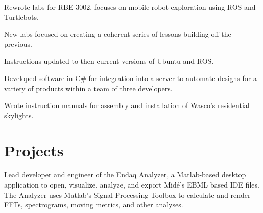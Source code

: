 \documentclass[letterpaper]{deedy-resume} %
\begin{document}
\begin{minipage}[t]{0.66\textwidth}
\sectionspace %



\begin{tightitemize}
\item Rewrote labs for RBE 3002, focuses on mobile robot exploration using ROS and Turtlebots.
\item New labs focused on creating a coherent series of lessons building off the previous.
\item Instructions updated to then-current versions of Ubuntu and ROS.
\end{tightitemize}

\sectionspace %



\begin{tightitemize}
\item Developed software in C\# for integration into a server to automate designs for a variety of products within a team of three developers.
\item Wrote instruction manuals for assembly and installation of Wasco's residential skylights.
\end{tightitemize}

\sectionspace %

\end{minipage} 




\newpage %

\section{Projects}


Lead developer and engineer of the Endaq Analyzer, a Matlab-based desktop application to open, visualize, analyze, and export Midé's EBML based IDE files.  The Analyzer uses Matlab's Signal Processing Toolbox to calculate and render FFTs, spectrograms, moving metrics, and other analyses.  
\end{document}
